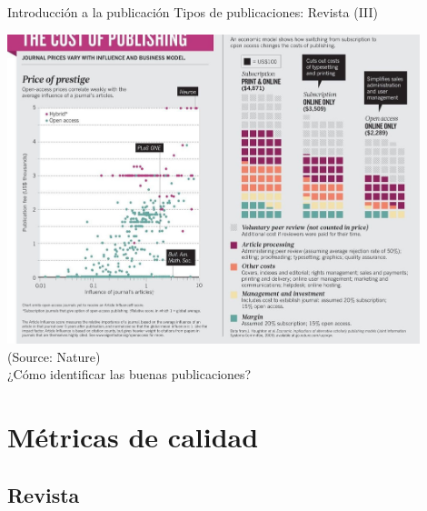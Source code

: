 \documentclass{beamer}
\begin{document}
\begin{frame}[plain]{Introducción a la publicación} {Tipos de publicaciones: Revista (III)}
	\vspace{-0.1cm}
 	 \begin{center}
   		\includegraphics[width=0.9\textwidth]{figs/openaccess.jpg}\\\tiny{(Source: Nature)}\\
	 \normalsize{¿Cómo identificar las buenas publicaciones?}
	\end{center}
\end{frame}


\section[Métricas]{Métricas de calidad}
\subsection{Revista}
\end{document}
